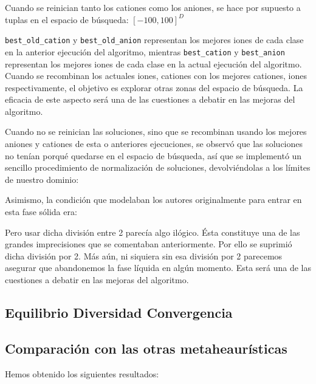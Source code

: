 \documentclass[a4paper,11pt]{article}
\begin{document}
\begin{itemize}
 Cuando se reinician tanto los cationes como los aniones, se hace por supuesto a tuplas en el espacio de búsqueda: $[-100,100]^D$
 
 \texttt{best\_old\_cation} y \texttt{best\_old\_anion} representan los mejores iones de cada clase en la anterior ejecución del
 algoritmo, mientras \texttt{best\_cation} y \texttt{best\_anion} representan los mejores iones de cada clase en la actual 
 ejecución del algoritmo. Cuando se recombinan los actuales iones, cationes con los mejores cationes, iones respectivamente,
 el objetivo es explorar otras zonas del espacio de búsqueda. La eficacia de este aspecto será una de las cuestiones a debatir
 en las mejoras del algoritmo.
 
 Cuando no se reinician las soluciones, sino que se recombinan usando los mejores aniones y cationes de esta o anteriores ejecuciones,
 se observó que las soluciones no tenían porqué quedarse en el espacio de búsqueda, así que se implementó un sencillo procedimiento
 de normalización de soluciones, devolviéndolas a los límites de nuestro dominio:
 
  \small{\texttt{}}
  \normalsize
 
 Asimismo, la condición que modelaban los autores originalmente para entrar en esta fase sólida era:
 
  \small{\texttt{}}
  \normalsize
  
 Pero usar dicha división entre 2 parecía algo ilógico. Ésta constituye una de las grandes imprecisiones que se comentaban
 anteriormente. Por ello se suprimió dicha división por 2. Más aún, ni siquiera sin esa división por 2 parecemos asegurar que abandonemos
 la fase líquida en algún momento. Esta será una de las cuestiones a debatir en las mejoras del algoritmo.
\end{itemize} 
 
 \subsection{Equilibrio Diversidad Convergencia}
 
 \subsection{Comparación con las otras metaheaurísticas}
 
 Hemos obtenido los siguientes resultados:
 
\end{document}
